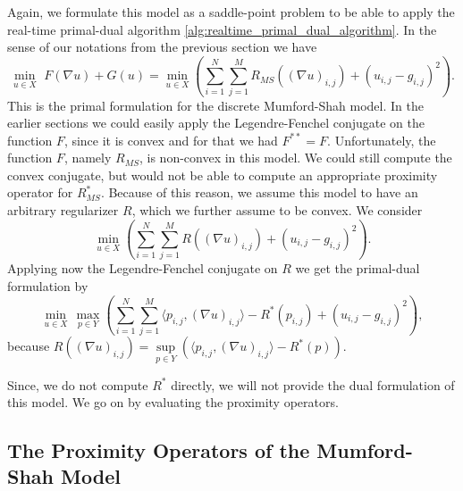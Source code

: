 \documentclass{scrreprt}
\begin{document}
            Again, we formulate this model as a saddle-point problem to be able to apply the real-time primal-dual algorithm \ref{alg:realtime_primal_dual_algorithm}. In the sense of our notations from the previous section we have
                $$
                    \min_{u \in X}\,\, F(\nabla u) + G(u) = \min_{u \in X} \left( \sum_{i = 1}^{N} \sum_{j = 1}^{M} R_{MS}((\nabla u)_{i,j}) + (u_{i,j} - g_{i,j})^{2} \right).
                $$
            This is the primal formulation for the discrete Mumford-Shah model. In the earlier sections we could easily apply the Legendre-Fenchel conjugate on the function $F$, since it is convex and for that we had $F^{\ast\ast} = F$. Unfortunately, the function $F$, namely $R_{MS}$, is non-convex in this model. We could still compute the convex conjugate, but would not be able to compute an appropriate proximity operator for $R_{MS}^{\ast}$. Because of this reason, we assume this  model to have an arbitrary regularizer $R$, which we further assume to be convex. We consider
                $$
                    \min_{u \in X} \left( \sum_{i = 1}^{N} \sum_{j = 1}^{M} R((\nabla u)_{i,j}) + (u_{i,j} - g_{i,j})^{2} \right).
                $$
            Applying now the Legendre-Fenchel conjugate on $R$ we get the primal-dual formulation by
                $$
                    \min_{u \in X}\, \max_{p \in Y} \left( \sum_{i = 1}^{N} \sum_{j = 1}^{M} \langle p_{i,j}, (\nabla u)_{i,j} \rangle - R^{\ast}(p_{i,j}) + (u_{i,j} - g_{i,j})^{2} \right),
                $$
            because $R\left(\left(\nabla u\right)_{i,j}\right) = \sup\limits_{p \in Y} \left( \langle p_{i,j}, (\nabla u)_{i,j} \rangle - R^{\ast}(p) \right)$.

            Since, we do not compute $R^{\ast}$ directly, we will not provide the dual formulation of this model. We go on by evaluating the proximity operators.


        \subsection{The Proximity Operators of the Mumford-Shah Model} %
        \label{sub:the_proximity_operators_of_the_mumford_shah_model}
            
\end{document}
